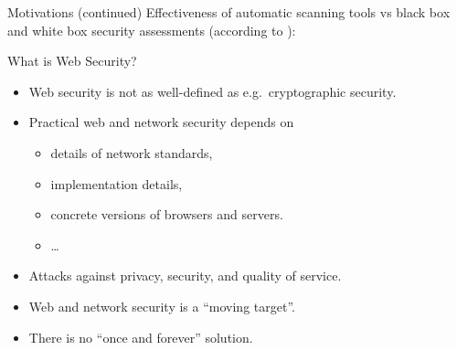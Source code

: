 \documentclass{beamer}
\begin{document}
\begin{slide}{Motivations (continued)}
  Effectiveness of automatic scanning tools vs black box and white box
  security assessments (according to \cite{wasc2008}):
\begin{center}
\end{center}
\end{slide}



\begin{slide}{What is Web Security?}
  \begin{itemize}
    \item Web security is not as well-defined as e.g.\ cryptographic security.
    \item Practical web and network security depends on
      \begin{itemize}
        \item details of network standards, 
        \item implementation details,
        \item concrete versions of browsers and servers.
        \item \ldots
      \end{itemize}
    \item Attacks against privacy, security, \alert{and} quality of service.
    \item Web and network security is a ``moving target''. 
    \item There is no ``once and forever'' solution.
  \end{itemize}
\end{slide}
\end{document}
